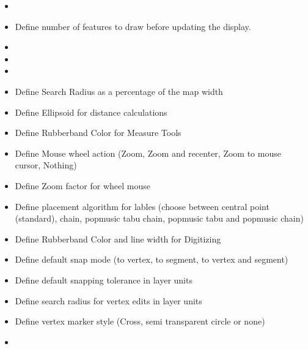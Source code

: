 
\begin{itemize}
\item {}
\item Define number of features to draw before updating the display.
\item {}
\item {}
\item {} 
\end{itemize}


\begin{itemize}
\item Define Search Radius as a percentage of the map width
\item Define Ellipsoid for distance calculations
\item Define Rubberband Color for Measure Tools
\item Define Mouse wheel action (Zoom, Zoom and recenter, Zoom to mouse cursor, Nothing)
\item Define Zoom factor for wheel mouse
\end{itemize}


\begin{itemize}
\item Define placement algorithm for lables (choose between central point
(standard), chain, popmusic tabu chain, popmusic tabu and popmusic chain)
\end{itemize}


\begin{itemize}
\item Define Rubberband Color and line width for Digitizing
\item Define default snap mode (to vertex, to segment, to vertex and segment)
\item Define default snapping tolerance in layer units
\item Define search radius for vertex edits in layer units
\item Define vertex marker style (Cross, semi transparent circle or none)
\item {}
\end{itemize}

